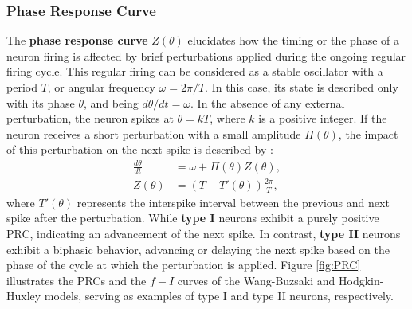 \documentclass[../main.tex]{subfiles}
\begin{document}
\subsubsection{Phase Response Curve}
The \textbf{phase response curve} $Z(\theta)$ elucidates how the timing or the phase of a neuron firing is affected by brief perturbations applied during the ongoing regular firing cycle.
This regular firing can be considered as a stable oscillator with a period $T$, or angular frequency $\omega = 2\pi/T$.
In this case, its state is described only with its phase $\theta$, and being $d\theta/dt = \omega$.
In the absence of any external perturbation, the neuron spikes at $\theta = kT$, where $k$ is a positive integer.
If the neuron receives a short perturbation with a small amplitude $\Pi(\theta)$, the impact of this perturbation on the next spike is described by \citep{izhikevich_dynamical_2007}:
\begin{equation}
\begin{aligned}
    \displaystyle\frac{d\theta}{dt} &= \omega + \Pi(\theta)Z(\theta),\\
    Z(\theta) &= (T-T'(\theta))\displaystyle\frac{2\pi}{T}, 
    \label{eq:PRC}
\end{aligned}
\end{equation}
where $T'(\theta)$ represents the interspike interval between the previous and next spike after the perturbation.
While \textbf{type I} neurons exhibit a purely positive PRC, indicating an advancement of the next spike.
In contrast, \textbf{type II} neurons exhibit a biphasic behavior, advancing or delaying the next spike based on the phase of the cycle at which the perturbation is applied.
Figure \ref{fig:PRC} illustrates the PRCs and the $f-I$ curves of the Wang-Buzsaki and Hodgkin-Huxley models, serving as examples of type I and type II neurons, respectively.
\end{document}
